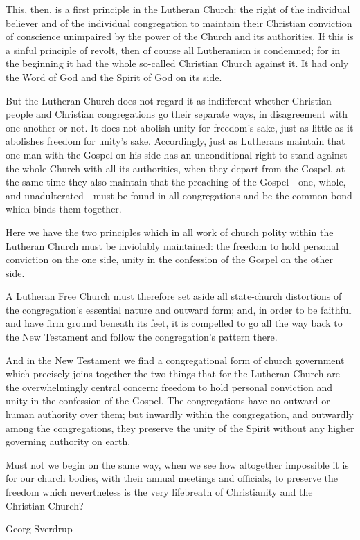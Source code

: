 This, then, is a first principle in the Lutheran Church: the right of the individual believer and of the individual congregation to maintain their Christian conviction of conscience unimpaired by the power of the Church and its authorities. If this is a sinful principle of revolt, then of course all Lutheranism is condemned; for in the beginning it had the whole so-called Christian Church against it. It had only the Word of God and the Spirit of God on its side.

But the Lutheran Church does not regard it as indifferent whether Christian people and Christian congregations go their separate ways, in disagreement with one another or not. It does not abolish unity for freedom’s sake, just as little as it abolishes freedom for unity’s sake. Accordingly, just as Lutherans maintain that one man with the Gospel on his side has an unconditional right to stand against the whole Church with all its authorities, when they depart from the Gospel, at the same time they also maintain that the preaching of the Gospel—one, whole, and unadulterated—must be found in all congregations and be the common bond which binds them together.

Here we have the two principles which in all work of church polity within the Lutheran Church must be inviolably maintained: the freedom to hold personal conviction on the one side, unity in the confession of the Gospel on the other side.

A Lutheran Free Church must therefore set aside all state-church distortions of the congregation’s essential nature and outward form; and, in order to be faithful and have firm ground beneath its feet, it is compelled to go all the way back to the New Testament and follow the congregation’s pattern there.

And in the New Testament we find a congregational form of church government which precisely joins together the two things that for the Lutheran Church are the overwhelmingly central concern: freedom to hold personal conviction and unity in the confession of the Gospel. The congregations have no outward or human authority over them; but inwardly within the congregation, and outwardly among the congregations, they preserve the unity of the Spirit without any higher governing authority on earth.

Must not we begin on the same way, when we see how altogether impossible it is for our church bodies, with their annual meetings and officials, to preserve the freedom which nevertheless is the very lifebreath of Christianity and the Christian Church?

Georg Sverdrup
